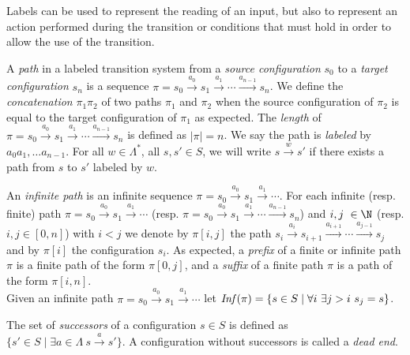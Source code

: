 \noindent
Labels can be used to represent the reading of an input, but also to represent an action performed during the transition or conditions that must hold in order to allow the use of the transition.

A {\em path} in a labeled transition system from a {\em source configuration} $s_0$
to a {\em target configuration} $s_n$ is a sequence 
$\pi = s_0 \xrightarrow{a_0 } s_1 \xrightarrow{a_1 } \cdots \xrightarrow{a_{n-1} } s_n$. 
We define the {\em concatenation} $ \pi_1 \pi_2$ of 
two paths $\pi_1$ and $\pi_2$ when the source configuration of $\pi_2$ is equal to the target configuration of $\pi_1$
as expected.
The {\em length} of 
$\pi = s_0 \xrightarrow{a_0 } s_1 \xrightarrow{a_1 } \cdots \xrightarrow{a_{n-1} } s_n$
is defined as $|\pi|=n$. We say the path is {\em labeled} by $a_0 a_1 , \ldots a_{n-1}$.
For all $w \in \Lambda^*$, all $s,s' \in S$, we will write $s \xrightarrow{w } s'$ if there exists a path from $s$ to $s'$ labeled by $w$. 

An {\em infinite path} is an infinite sequence
 $\pi = s_0 \xrightarrow{a_0 } s_1 \xrightarrow{a_1 } \cdots $.
For each infinite (resp. finite) path  $\pi = s_0 \xrightarrow{a_0 } s_1 \xrightarrow{a_1 } \cdots$ 
(resp. $\pi = s_0 \xrightarrow{a_0 } s_1 \xrightarrow{a_1 } \cdots \xrightarrow{a_{n-1}} s_n$)
and $i,j \in \N$ (resp. $i,j \in [0,n]$) with $i<j$ we denote
by $\pi[i,j]$ the path 
$s_i  \xrightarrow{a_i } s_{i+1}  \xrightarrow{a_{i+1} } \cdots  \xrightarrow{a_{j-1} } s_j$
 and by $\pi[i]$ the configuration $s_i$.
% 
As expected, a {\em prefix} of a finite or infinite path $\pi$ is a finite path of the form $\pi[0,j]$, and
a  {\em suffix} of a finite path $\pi$ is a path of the form $\pi[i,n]$.  \\
Given an infinite path $\pi = s_0 \xrightarrow{a_0 } s_1 \xrightarrow{a_1 } \cdots$ let
$\text{\textit{Inf}}(\pi) = \{ s \in S \mid \forall i ~ \exists j > i ~ s_j = s\}$.


\noindent
The set of {\em successors} of a configuration $s \in S$ is deﬁned as
$\{ s' \in S \mid \exists a \in \Lambda ~ s \xrightarrow{a} s'\}$.
A configuration without successors is called a {\em dead end}.  \\


